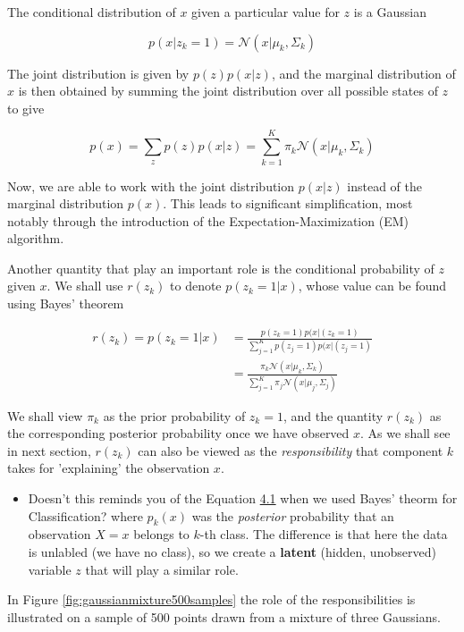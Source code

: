 \documentclass[]{book}
\newenvironment{rmdblock}[1]
  {\begin{shaded*}
  \begin{itemize}
  \renewcommand{\labelitemi}{
    \raisebox{-.7\height}[0pt][0pt]{
      {\setkeys{Gin}{width=2em,keepaspectratio}\texttt{[image: img/icons/\#1]}}
    }
  }
  \item
  }
  {
  \end{itemize}
  \end{shaded*}
  }
\newenvironment{rmdtip}
  {\begin{rmdblock}{tip}}
  {\end{rmdblock}}
\theoremstyle{definition}
\theoremstyle{definition}
\theoremstyle{definition}
\theoremstyle{remark}
\begin{document}
The conditional distribution of \(x\) given a particular value for \(z\)
is a Gaussian

\[p(x|z_k=1)= \mathcal{N}(x| \mu_k, \Sigma_k)\]

The joint distribution is given by \(p(z)p(x|z)\), and the marginal
distribution of \(x\) is then obtained by summing the joint distribution
over all possible states of \(z\) to give

\[p(x)= \sum_z p(z)p(x|z) = \sum_{k=1}^{K} \pi_k \mathcal{N}(x| \mu_k, \Sigma_k)\]

Now, we are able to work with the joint distribution \(p(x|z)\) instead
of the marginal distribution \(p(x)\). This leads to significant
simplification, most notably through the introduction of the
Expectation-Maximization (EM) algorithm.

Another quantity that play an important role is the conditional
probability of \(z\) given \(x\). We shall use \(r(z_k)\) to denote
\(p(z_k = 1|x)\), whose value can be found using Bayes' theorem

\begin{align}
r(z_k)= p(z_k = 1|x) &= \frac{ p(z_k = 1) p(x|(z_k=1)}{\displaystyle \sum_{j=1}^{K} p(z_j = 1) p(x|(z_j=1)} \nonumber \\
&= \frac{\pi_k \mathcal{N}(x| \mu_k, \Sigma_k)}{\displaystyle \sum_{j=1}^{K} \pi_j \mathcal{N}(x| \mu_j, \Sigma_j)} 
\label{eq:responsibilities}
\end{align}

We shall view \(\pi_k\) as the prior probability of \(z_k = 1\), and the
quantity \(r(z_k)\) as the corresponding posterior probability once we
have observed \(x\). As we shall see in next section, \(r(z_k)\) can
also be viewed as the \emph{responsibility} that component \(k\) takes
for 'explaining' the observation \(x\).

\begin{rmdtip}
Doesn't this reminds you of the Equation
\protect\hyperlink{eq:bayes}{4.1} when we used Bayes' theorm for
Classification? where \(p_k(x)\) was the \emph{posterior} probability
that an observation \(X=x\) belongs to \(k\)-th class. The difference is
that here the data is unlabled (we have no class), so we create a
\textbf{latent} (hidden, unobserved) variable \(z\) that will play a
similar role.
\end{rmdtip}

In Figure \ref{fig:gaussianmixture500samples} the role of the
responsibilities is illustrated on a sample of 500 points drawn from a
mixture of three Gaussians.
\end{document}
